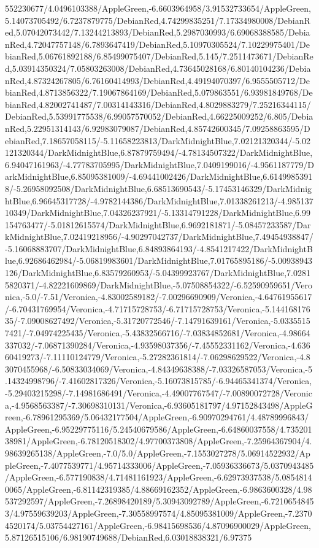 {\begin{tikzternal}
552230677/4.0496103388/AppleGreen,-6.6603964958/3.91532733654/AppleGreen,5.14073705492/6.7237879775/DebianRed,4.74299835251/7.17334980008/DebianRed,5.07042073442/7.13244213893/DebianRed,5.2987030993/6.69068388585/DebianRed,4.72047757148/6.7893647419/DebianRed,5.10970305524/7.10229975401/DebianRed,5.06761892188/6.85499075407/DebianRed,5.145/7.2511473671/DebianRed,5.03914350324/7.05803263008/DebianRed,4.73645028168/6.80140104236/DebianRed,4.87324267805/6.76160414993/DebianRed,4.49194070397/6.9555505712/DebianRed,4.8713856322/7.19067864169/DebianRed,5.079863551/6.93981849768/DebianRed,4.82002741487/7.00314143316/DebianRed,4.8029883279/7.25216344115/DebianRed,5.53991775538/6.99057570052/DebianRed,4.66225009252/6.805/DebianRed,5.22951314143/6.92983079087/DebianRed,4.85742600345/7.09258863595/DebianRed,7.18657058115/-5.11658223813/DarkMidnightBlue,7.02121320344/-5.02121320344/DarkMidnightBlue,6.87879759494/-4.78134507322/DarkMidnightBlue,6.94047161963/-4.77783705995/DarkMidnightBlue,7.0409199016/-4.9561187779/DarkMidnightBlue,6.85095381009/-4.69441002426/DarkMidnightBlue,6.61499853918/-5.26958092508/DarkMidnightBlue,6.68513690543/-5.17453146329/DarkMidnightBlue,6.96645317728/-4.9782144386/DarkMidnightBlue,7.01338261213/-4.98513710349/DarkMidnightBlue,7.04326237921/-5.13314791228/DarkMidnightBlue,6.99154763477/-5.01812615574/DarkMidnightBlue,6.9692181871/-5.08457233587/DarkMidnightBlue,7.02419218956/-4.90297042737/DarkMidnightBlue,7.49454938847/-5.16068883707/DarkMidnightBlue,6.84893864193/-4.8541217422/DarkMidnightBlue,6.92686462984/-5.06819983601/DarkMidnightBlue,7.01765895186/-5.00938943126/DarkMidnightBlue,6.83579260953/-5.04399923767/DarkMidnightBlue,7.02815820371/-4.82221609869/DarkMidnightBlue,-5.07508854322/-6.52590959651/Veronica,-5.0/-7.51/Veronica,-4.83002589182/-7.00296690909/Veronica,-4.64761955617/-6.70431769954/Veronica,-4.71715728753/-6.71715728753/Veronica,-5.14416817635/-7.09008627492/Veronica,-5.31720772546/-7.14791639161/Veronica,-5.03355157421/-7.04974225435/Veronica,-5.43832566716/-7.03834852681/Veronica,-4.98664337032/-7.06871390284/Veronica,-4.93598037356/-7.45552331162/Veronica,-4.63660419273/-7.11110124779/Veronica,-5.27282361814/-7.06298629522/Veronica,-4.83070455968/-6.50833034069/Veronica,-4.84349638388/-7.03326587053/Veronica,-5.14324998796/-7.41602817326/Veronica,-5.16073815785/-6.94465341374/Veronica,-5.29403215298/-7.14981686491/Veronica,-4.49007767547/-7.00890072728/Veronica,-4.9568563387/-7.30698310131/Veronica,-6.93605181797/4.97152843498/AppleGreen,-6.78961295369/5.06432177504/AppleGreen,-6.90970294761/4.48789996843/AppleGreen,-6.95229775116/5.24540679586/AppleGreen,-6.64860037558/4.73520138981/AppleGreen,-6.78120518302/4.97700373808/AppleGreen,-7.25964367904/4.98639265138/AppleGreen,-7.0/5.0/AppleGreen,-7.1553027278/5.06914522932/AppleGreen,-7.4077539771/4.95714333006/AppleGreen,-7.05936336673/5.0370943485/AppleGreen,-6.577190838/4.71481161923/AppleGreen,-6.62973937538/5.08548140065/AppleGreen,-6.81142319385/4.88669162352/AppleGreen,-6.9863600328/4.98537292597/AppleGreen,-7.26898420189/5.30943092789/AppleGreen,-6.72106548453/4.97559639203/AppleGreen,-7.30558997574/4.85095381009/AppleGreen,-7.23704520174/5.03754427161/AppleGreen,-6.98415698536/4.87096900029/AppleGreen,5.87126515106/6.98190749688/DebianRed,6.03018838321/6.97375
\end{tikzternal}}
